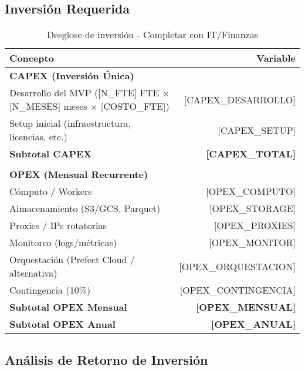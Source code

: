 \documentclass[12pt,a4paper]{article}
\begin{document}
\subsection{Inversión Requerida}

\begin{table}[h]
\centering
\begin{tabularx}{\textwidth}{|X|r|}
\hline
\rowcolor{lightgray}
\textbf{Concepto} & \textbf{Variable} \\
\hline
\multicolumn{2}{|l|}{\textbf{CAPEX (Inversión Única)}} \\
\hline
Desarrollo del MVP ([N\_FTE] FTE × [N\_MESES] meses × [COSTO\_FTE]) & [CAPEX\_DESARROLLO] \\
\hline
Setup inicial (infraestructura, licencias, etc.) & [CAPEX\_SETUP] \\
\hline
\rowcolor{lightgray}
\textbf{Subtotal CAPEX} & \textbf{[CAPEX\_TOTAL]} \\
\hline
\multicolumn{2}{|c|}{} \\
\hline
\multicolumn{2}{|l|}{\textbf{OPEX (Mensual Recurrente)}} \\
\hline
Cómputo / Workers & [OPEX\_COMPUTO] \\
\hline
Almacenamiento (S3/GCS, Parquet) & [OPEX\_STORAGE] \\
\hline
Proxies / IPs rotatorias & [OPEX\_PROXIES] \\
\hline
Monitoreo (logs/métricas) & [OPEX\_MONITOR] \\
\hline
Orquestación (Prefect Cloud / alternativa) & [OPEX\_ORQUESTACION] \\
\hline
Contingencia (10\%) & [OPEX\_CONTINGENCIA] \\
\hline
\rowcolor{lightgray}
\textbf{Subtotal OPEX Mensual} & \textbf{[OPEX\_MENSUAL]} \\
\hline
\rowcolor{lightgray}
\textbf{Subtotal OPEX Anual} & \textbf{[OPEX\_ANUAL]} \\
\hline
\end{tabularx}
\caption{Desglose de inversión - Completar con IT/Finanzas}
\end{table}

\subsection{Análisis de Retorno de Inversión}
\end{document}
